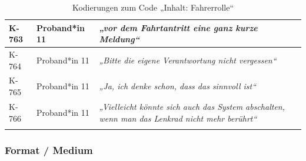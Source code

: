{\begin{xltabular}{\textwidth}{
    |P{0.10\textwidth}
    |P{0.17\textwidth}
    |Y|
}
\hline
K-763 & Proband*in 11 & \textit{„vor dem Fahrtantritt eine ganz kurze Meldung“} \\
\hline
K-764 & Proband*in 11 & \textit{„Bitte die eigene Verantwortung nicht vergessen“} \\
\hline
K-765 & Proband*in 11 & \textit{„Ja, ich denke schon, dass das sinnvoll ist“} \\
\hline
K-766 & Proband*in 11 & \textit{„Vielleicht könnte sich auch das System abschalten, wenn man das Lenkrad nicht mehr berührt“} \\
\hline
\caption{Kodierungen zum Code „Inhalt: Fahrerrolle“}\label{tab:kodiernachweis-inhalt-fahrerrolle}\\
\end{xltabular}
}

\clearpage
\subsubsection{Format / Medium}

